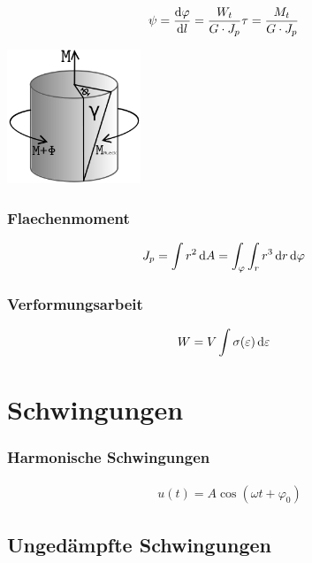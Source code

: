 \begin{multicols}{2}{}
\begin{align*}
\psi&=\frac{\mathop{}\!\mathrm{d} \varphi}{\mathop{}\!\mathrm{d} l}=\frac{W_t}{G\cdot J_p}\tau=\frac{M_t}{G\cdot J_p}
\end{align*}
\hfill

\begin{center}
 \includegraphics[width=40mm,height=40mm,keepaspectratio=true]{./Physik/Bilder/Scherbeanspruchung.png}
\end{center}
\end{multicols}


\begin{multicols}{2}{}
\subsubsection{Flaechenmoment}
\begin{align*}
J_p&=\int r^2\mathop{}\!\mathrm{d} A=\int_\varphi\int_r r^3\mathop{}\!\mathrm{d} r \mathop{}\!\mathrm{d} \varphi 
\end{align*}


\subsubsection{Verformungsarbeit}
\begin{align*}
W&=V\int \sigma(\varepsilon) \mathop{}\!\mathrm{d} \varepsilon 
\end{align*}
\end{multicols}

\newpage
\section{Schwingungen}


\subsubsection{Harmonische Schwingungen}
\begin{align*}
u(t)=A\cos(\omega t+\varphi_0)
\end{align*}


\subsection{Ungedämpfte Schwingungen}

